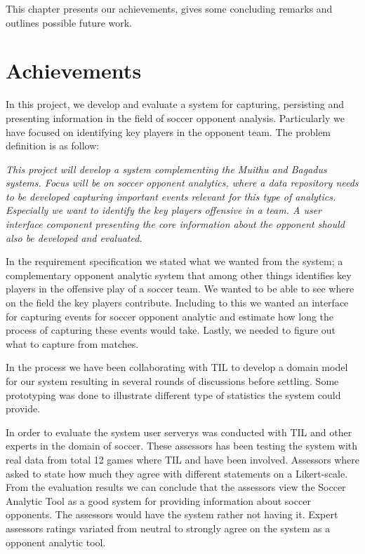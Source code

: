 This chapter presents our achievements, gives some concluding remarks and outlines possible future work.

\section{Achievements}
In this project, we develop and evaluate a system for capturing, persisting and presenting information in the field of soccer opponent analysis. Particularly we have focused on identifying key players in the opponent team. The problem definition is as follow:

\textit{This project will develop a system complementing the Muithu and Bagadus systems. Focus will be on soccer opponent analytics, where a data repository needs to be developed capturing important events relevant for this type of analytics. Especially we want to identify the key players offensive in a team. A user interface component presenting the core information about the opponent should also be developed and evaluated.}

In the requirement specification we stated what we wanted from the system; a complementary opponent analytic system that among other things identifies key players in the offensive play of a soccer team. We wanted to be able to see where on the field the key players contribute. Including to this we wanted an interface for capturing events for soccer opponent analytic and estimate how long the process of capturing these events would take. Lastly, we needed to figure out what to capture from matches.

In the process we have been collaborating with \ac{TIL} to develop a domain model for our system resulting in several rounds of discussions before settling. Some prototyping was done to illustrate different type of statistics the system could provide. 

In order to evaluate the system user serverys was conducted with \ac{TIL} and other experts in the domain of soccer. These assessors has been testing the system with real data from total 12 games where \ac{TIL} and {\SIF} have been involved. Assessors where asked to state how much they agree with different statements on a Likert-scale. From the evaluation results we can conclude that the assessors view the Soccer Analytic Tool as a good system for providing information about soccer opponents. The assessors would have the system rather not having it. Expert assessors ratings variated from neutral to strongly agree on the system as a opponent analytic tool. 

